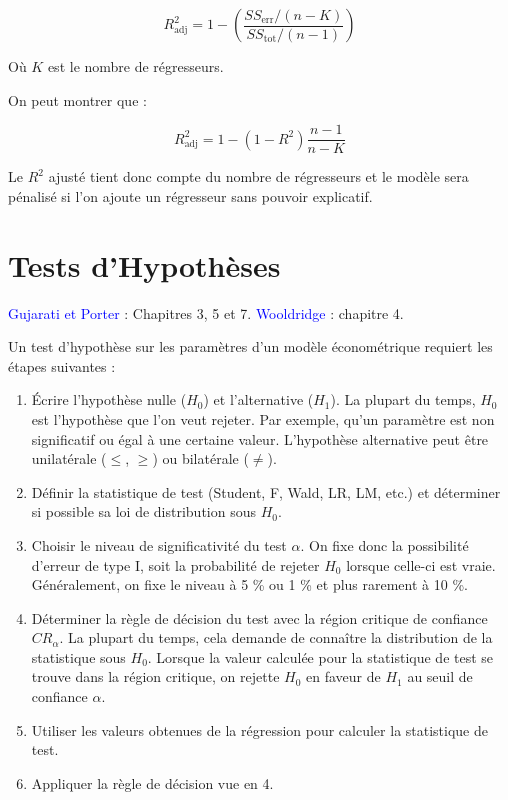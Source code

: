 \documentclass[14pt]{extarticle} %
\theoremstyle{definition}
\theoremstyle{plain}
\newcommand{\livre}[1]{\textcolor{blue}{#1}}
\begin{document}
\[
R_{\text{adj}}^2 = 1 - \left( \frac{SS_{\text{err}} / (n - K)}{SS_{\text{tot}} / (n - 1)} \right)
\]

Où $K$ est le nombre de régresseurs.

On peut montrer que :

\[
R_{\text{adj}}^2 = 1 - (1 - R^2) \frac{n - 1}{n - K}
\]

Le $R^2$ ajusté tient donc compte du nombre de régresseurs et le modèle sera pénalisé si l’on ajoute un régresseur sans pouvoir explicatif.

\section{Tests d’Hypothèses}

\livre{Gujarati et Porter} : Chapitres 3, 5 et 7. \livre{Wooldridge} : chapitre 4.

Un test d’hypothèse sur les paramètres d’un modèle économétrique requiert les étapes suivantes :

\begin{enumerate}
    \item Écrire l’hypothèse nulle ($H_0$) et l’alternative ($H_1$). La plupart du temps, $H_0$ est l’hypothèse que l’on veut rejeter. Par exemple, qu’un paramètre est non significatif ou égal à une certaine valeur. L’hypothèse alternative peut être unilatérale ($\leq$, $\geq$) ou bilatérale ($\neq$).
    \item Définir la statistique de test (Student, F, Wald, LR, LM, etc.) et déterminer si possible sa loi de distribution sous $H_0$.
    \item Choisir le niveau de significativité du test $\alpha$. On fixe donc la possibilité d’erreur de type I, soit la probabilité de rejeter $H_0$ lorsque celle-ci est vraie. Généralement, on fixe le niveau à 5 \% ou 1 \% et plus rarement à 10 \%.
    \item Déterminer la règle de décision du test avec la région critique de confiance $CR_\alpha$. La plupart du temps, cela demande de connaître la distribution de la statistique sous $H_0$. Lorsque la valeur calculée pour la statistique de test se trouve dans la région critique, on rejette $H_0$ en faveur de $H_1$ au seuil de confiance $\alpha$.
    \item Utiliser les valeurs obtenues de la régression pour calculer la statistique de test.
    \item Appliquer la règle de décision vue en 4.
\end{enumerate}
\end{document}
